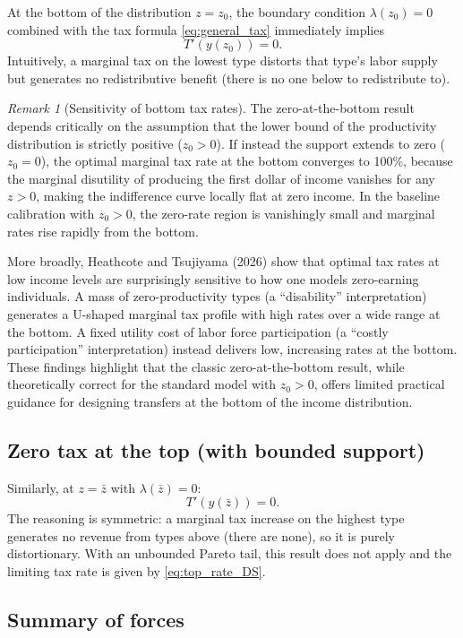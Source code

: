 \documentclass[12pt,a4paper]{article}
\theoremstyle{definition}
\theoremstyle{plain}
\theoremstyle{remark}
\newtheorem{remark}{Remark}[section]
\newcommand{\zbar}{\bar{z}}
\newcommand{\zlow}{z_{\scriptscriptstyle 0}}
\begin{document}
At the bottom of the distribution $z = \zlow$, the boundary condition $\lambda(\zlow) = 0$ combined with the tax formula \eqref{eq:general_tax} immediately implies
\[
  T'(y(\zlow)) = 0.
\]
Intuitively, a marginal tax on the lowest type distorts that type's labor supply but generates no redistributive benefit (there is no one below to redistribute to).

\begin{remark}[Sensitivity of bottom tax rates]
The zero-at-the-bottom result depends critically on the assumption that the lower bound of the productivity distribution is strictly positive ($\zlow > 0$). If instead the support extends to zero ($\zlow = 0$), the optimal marginal tax rate at the bottom converges to 100\%, because the marginal disutility of producing the first dollar of income vanishes for any $z > 0$, making the indifference curve locally flat at zero income. In the baseline calibration with $\zlow > 0$, the zero-rate region is vanishingly small and marginal rates rise rapidly from the bottom.

More broadly, Heathcote and Tsujiyama (2026) show that optimal tax rates at low income levels are surprisingly sensitive to how one models zero-earning individuals. A mass of zero-productivity types (a ``disability'' interpretation) generates a U-shaped marginal tax profile with high rates over a wide range at the bottom. A fixed utility cost of labor force participation (a ``costly participation'' interpretation) instead delivers low, increasing rates at the bottom.  These findings highlight that the classic zero-at-the-bottom result, while theoretically correct for the standard model with $\zlow > 0$, offers limited practical guidance for designing transfers at the bottom of the income distribution.
\end{remark}

\subsection{Zero tax at the top (with bounded support)}

Similarly, at $z = \zbar$ with $\lambda(\zbar) = 0$:
\[
  T'(y(\zbar)) = 0.
\]
The reasoning is symmetric: a marginal tax increase on the highest type generates no revenue from types above (there are none), so it is purely distortionary. With an unbounded Pareto tail, this result does not apply and the limiting tax rate is given by \eqref{eq:top_rate_DS}.

\subsection{Summary of forces}
\end{document}

